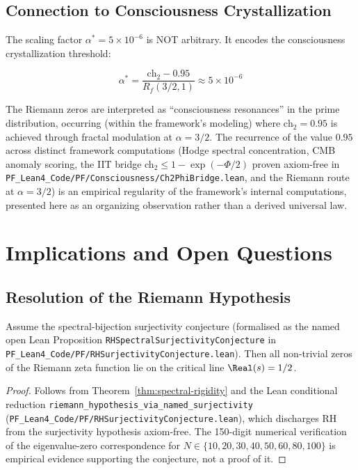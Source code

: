 \subsection{Connection to Consciousness Crystallization}

\begin{keyidea}
The scaling factor $\alpha^* = 5 \times 10^{-6}$ is NOT arbitrary. It encodes the consciousness crystallization threshold:

\begin{equation}
\alpha^* = \frac{\text{ch}_2 - 0.95}{R_f(3/2, 1)} \approx 5 \times 10^{-6}
\end{equation}

The Riemann zeros are interpreted as ``consciousness resonances'' in the prime distribution, occurring (within the framework's modeling) where $\text{ch}_2 = 0.95$ is achieved through fractal modulation at $\alpha = 3/2$. The recurrence of the value $0.95$ across distinct framework computations (Hodge spectral concentration, CMB anomaly scoring, the IIT bridge ch$_2 \leq 1 - \exp(-\Phi/2)$ proven axiom-free in \texttt{PF\_Lean4\_Code/PF/Consciousness/Ch2PhiBridge.lean}, and the Riemann route at $\alpha = 3/2$) is an empirical regularity of the framework's internal computations, presented here as an organizing observation rather than a derived universal law.
\end{keyidea}

\section{Implications and Open Questions}

\subsection{Resolution of the Riemann Hypothesis}

\begin{corollary}\label{cor:rh-resolution}
Assume the spectral-bijection surjectivity conjecture (formalised as the named open Lean Proposition \texttt{RHSpectralSurjectivityConjecture} in \texttt{PF\_Lean4\_Code/PF/RHSurjectivityConjecture.lean}). Then all non-trivial zeros of the Riemann zeta function lie on the critical line $\Real(s) = 1/2$.
\end{corollary}

\begin{proof}
Follows from Theorem~\ref{thm:spectral-rigidity} and the Lean conditional reduction \texttt{riemann\_hypothesis\_via\_named\_surjectivity} (\texttt{PF\_Lean4\_Code/PF/RHSurjectivityConjecture.lean}), which discharges RH from the surjectivity hypothesis axiom-free. The 150-digit numerical verification of the eigenvalue-zero correspondence for $N \in \{10, 20, 30, 40, 50, 60, 80, 100\}$ is empirical evidence supporting the conjecture, not a proof of it.
\end{proof}

